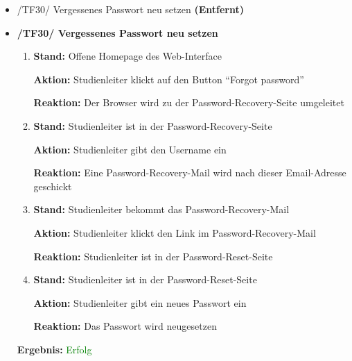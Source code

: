 \documentclass[a4paper]{scrreprt}
\begin{document}
\begin{itemize}
		                      \item /TF30/ Vergessenes Passwort neu setzen \textbf{(Entfernt)}
		      		        \vspace*{0.6cm}
                              
                            \item \textbf{/TF30/ Vergessenes Passwort neu setzen}
                                \begin{enumerate}
                                    \item \par \textbf{Stand: }Offene Homepage des Web-Interface
                                        \par \textbf{Aktion: }Studienleiter klickt auf den Button ``Forgot password''
                                        \par \textbf{Reaktion: }Der Browser wird zu der Password-Recovery-Seite umgeleitet
                                    \item \par \textbf{Stand: }Studienleiter ist in der Password-Recovery-Seite
                                        \par \textbf{Aktion: }Studienleiter gibt den Username ein
                                        \par \textbf{Reaktion: }Eine Password-Recovery-Mail wird nach dieser Email-Adresse geschickt
                                    \item \par \textbf{Stand: }Studienleiter bekommt das Password-Recovery-Mail
                                        \par \textbf{Aktion: }Studienleiter klickt den Link im Password-Recovery-Mail
                                        \par \textbf{Reaktion: }Studienleiter ist in der Password-Reset-Seite
                                    \item \par \textbf{Stand: }Studienleiter ist in der Password-Reset-Seite
                                        \par \textbf{Aktion: }Studienleiter gibt ein neues Passwort ein
                                        \par \textbf{Reaktion: }Das Passwort wird neugesetzen
                                \end{enumerate}
                                \vspace*{0.3cm}
                                \par \textbf{Ergebnis: }\textcolor{green}{Erfolg}
                                \vspace*{0.6cm}
		      		        

\end{itemize}
\end{document}
